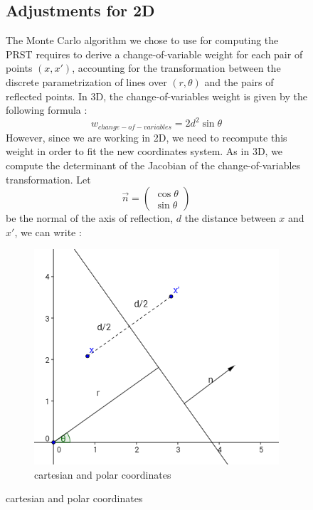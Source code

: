\documentclass[10pt,a4paper]{article}			%
\begin{document}
\begin{figure}[h]
	\subsection{Adjustments for 2D}
	

The Monte Carlo algorithm we chose to use for computing the PRST requires to derive a change-of-variable weight for each pair of points $(x,x')$, accounting for the transformation between the discrete parametrization of lines over $(r,\theta)$ and the pairs of reflected points. In 3D, the change-of-variables weight is given by the following formula :
\[w_{change-of-variables} = 2d^2\sin\theta\]
However, since we are working in 2D, we need to recompute this weight in order to fit the new coordinates system. As in 3D, we compute the determinant of the Jacobian of the change-of-variables transformation. Let 
\[\vec{n}=\begin{pmatrix}\cos\theta \\ \sin\theta\end{pmatrix}\]
be the normal of the axis of reflection, $d$ the distance between $x$ and $x'$, we can write :

\begin{figure}
\includegraphics[scale=0.6]{img/definitions.png}
\caption{cartesian and polar coordinates}
\label{definitions}
\end{figure}


\end{figure}
\end{document}
